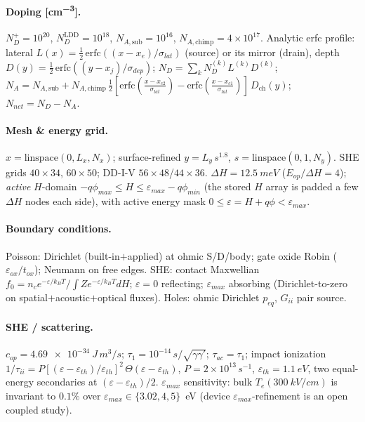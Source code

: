 \documentclass[11pt]{article}
\newcommand{\eps}{\varepsilon}
\begin{document}
\paragraph{Doping [\si{cm^{-3}}].} $N_D^{+}=10^{20}$, $N_D^{\text{LDD}}=10^{18}$,
$N_{A,\text{sub}}=10^{16}$, $N_{A,\text{chimp}}=4\times10^{17}$. Analytic erfc profile: lateral
$L(x)=\tfrac12\,\mathrm{erfc}((x{-}x_e)/\sigma_{lat})$ (source) or its mirror (drain), depth
$D(y)=\tfrac12\,\mathrm{erfc}((y{-}x_j)/\sigma_{dep})$; $N_D=\sum_k N_D^{(k)}L^{(k)}D^{(k)}$;
$N_A=N_{A,\text{sub}}+N_{A,\text{chimp}}\,\tfrac12[\mathrm{erfc}(\tfrac{x-x_{c2}}{\sigma_{lat}})-
\mathrm{erfc}(\tfrac{x-x_{c1}}{\sigma_{lat}})]\,D_{\text{ch}}(y)$; $N_{net}=N_D-N_A$.

\paragraph{Mesh \& energy grid.} $x=\mathrm{linspace}(0,L_x,N_x)$; surface-refined
$y=L_y\,s^{1.8}$, $s=\mathrm{linspace}(0,1,N_y)$. SHE grids $40\times34$, $60\times50$; DD-I-V
$56\times48$/$44\times36$. $\Delta H=\SI{12.5}{meV}$ ($E_{op}/\Delta H=4$); \emph{active} $H$-domain
$-q\phi_{max}\le H\le\eps_{max}-q\phi_{min}$ (the stored $H$ array is padded a few $\Delta H$ nodes
each side), with active energy mask $0\le\eps\!=\!H{+}q\phi<\eps_{max}$.

\paragraph{Boundary conditions.} Poisson: Dirichlet (built-in$+$applied) at ohmic S/D/body; gate
oxide Robin ($\eps_{ox}/t_{ox}$); Neumann on free edges. SHE: contact Maxwellian
$f_0=n_c e^{-\eps/k_BT}/\!\int Z e^{-\eps/k_BT}dH$; $\eps{=}0$ reflecting; $\eps_{max}$ absorbing
(Dirichlet-to-zero on spatial$+$acoustic$+$optical fluxes). Holes: ohmic Dirichlet $p_{eq}$,
$G_{ii}$ pair source.

\paragraph{SHE / scattering.} $c_{op}=\SI{4.69e-34}{J\,m^3/s}$;
$\tau_1=10^{-14}\,\si{s}/\sqrt{\gamma\gamma'}$; $\tau_{ac}=\tau_1$; impact ionization
$1/\tau_{ii}=P[(\eps-\eps_{th})/\eps_{th}]^2\,\Theta(\eps-\eps_{th})$,
$P=2\times10^{13}\,\si{s^{-1}}$, $\eps_{th}=\SI{1.1}{eV}$, two equal-energy secondaries at
$(\eps-\eps_{th})/2$. $\eps_{max}$ sensitivity: bulk $T_e(\SI{300}{kV/cm})$ is invariant to $0.1\%$
over $\eps_{max}\in\{3.02,4,5\}$~eV (device $\eps_{max}$-refinement is an open coupled study).
\end{document}
